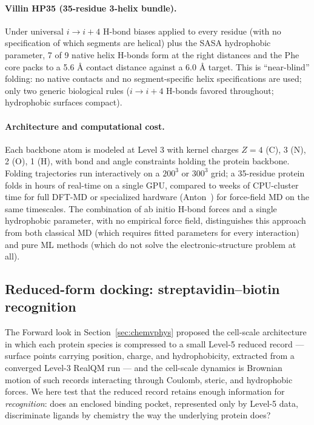 \documentclass[11pt]{article}
\begin{document}
\paragraph{Villin HP35 (35-residue 3-helix bundle).}
Under universal $i \to i{+}4$ H-bond biases applied to every residue (with no specification of which segments are helical) plus the SASA hydrophobic parameter, 7 of 9 native helix H-bonds form at the right distances and the Phe core packs to a 5.6 \AA{} contact distance against a 6.0 \AA{} target. This is ``near-blind'' folding: no native contacts and no segment-specific helix specifications are used; only two generic biological rules ($i \to i{+}4$ H-bonds favored throughout; hydrophobic surfaces compact).

\paragraph{Architecture and computational cost.}
Each backbone atom is modeled at Level 3 with kernel charges $Z = 4$ (C), 3 (N), 2 (O), 1 (H), with bond and angle constraints holding the protein backbone. Folding trajectories run interactively on a $200^3$ or $300^3$ grid; a 35-residue protein folds in hours of real-time on a single GPU, compared to weeks of CPU-cluster time for full DFT-MD or specialized hardware (Anton~\cite{Shaw10}) for force-field MD on the same timescales. The combination of ab initio H-bond forces and a single hydrophobic parameter, with no empirical force field, distinguishes this approach from both classical MD (which requires fitted parameters for every interaction) and pure ML methods (which do not solve the electronic-structure problem at all).

\subsection{Reduced-form docking: streptavidin--biotin recognition}\label{sec:reduced-docking}

The Forward look in Section~\ref{sec:chemvphys} proposed the cell-scale architecture in which each protein species is compressed to a small Level-5 reduced record --- surface points carrying position, charge, and hydrophobicity, extracted from a converged Level-3 RealQM run --- and the cell-scale dynamics is Brownian motion of such records interacting through Coulomb, steric, and hydrophobic forces. We here test that the reduced record retains enough information for \emph{recognition}: does an enclosed binding pocket, represented only by Level-5 data, discriminate ligands by chemistry the way the underlying protein does?
\end{document}
